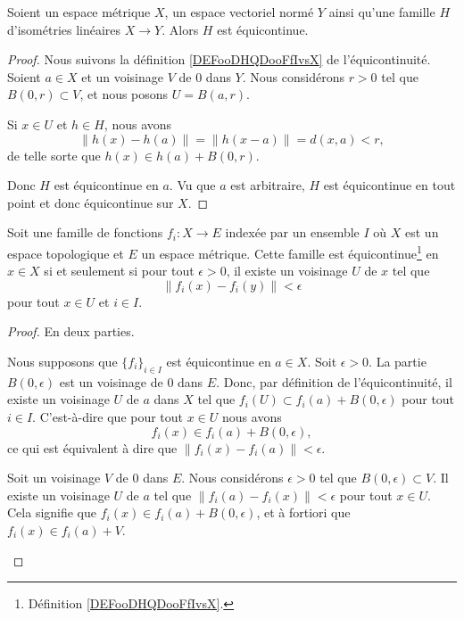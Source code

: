 \begin{lemma}        \label{LEMooMIHJooUhvPgM}
	Soient un espace métrique \( X\), un espace vectoriel normé \( Y\) ainsi qu'une famille \( H\) d'isométries linéaires \( X\to Y\). Alors \( H\) est équicontinue.
\end{lemma}

\begin{proof}
	Nous suivons la définition \ref{DEFooDHQDooFfIvsX} de l'équicontinuité. Soient \( a\in X\) et un voisinage \( V\) de \( 0\) dans \( Y\). Nous considérons \( r>0\) tel que \( B(0,r)\subset V\), et nous posons \( U=B(a,r)\).

	Si \( x\in U\) et \( h\in H\), nous avons
	\begin{equation}
		\| h(x)-h(a) \|=\| h(x-a) \|=d(x,a)<r,
	\end{equation}
	de telle sorte que \( h(x)\in h(a)+B(0,r)\).

	Donc \( H\) est équicontinue en \( a\). Vu que \( a\) est arbitraire, \( H\) est équicontinue en tout point et donc équicontinue sur \( X\).
\end{proof}

\begin{lemma}           \label{LEMooKEMRooYyqsBl}
	Soit une famille de fonctions \( f_i\colon X\to E\) indexée par un ensemble \( I\) où \( X\) est un espace topologique et \( E\) un espace métrique. Cette famille est équicontinue\footnote{Définition \ref{DEFooDHQDooFfIvsX}.} en \( x\in X\) si et seulement si pour tout \( \epsilon>0\), il existe un voisinage \( U\) de \( x\) tel que
	\begin{equation}
		\| f_i(x)-f_i(y) \|<\epsilon
	\end{equation}
	pour tout \( x\in U\) et \( i\in I\).
\end{lemma}

\begin{proof}
	En deux parties.
	\begin{subproof}
		\spitem[\( \Rightarrow\)]
		Nous supposons que \( \{ f_i \}_{i\in I}\) est équicontinue en \( a\in X\). Soit \( \epsilon>0\). La partie \( B(0,\epsilon)\) est un voisinage de \( 0\) dans \( E\). Donc, par définition de l'équicontinuité, il existe un voisinage \( U\) de \( a\) dans \( X\) tel que \( f_i(U)\subset f_i(a)+B(0,\epsilon)\) pour tout \( i\in I\). C'est-à-dire que pour tout \( x\in U\) nous avons
		\begin{equation}
			f_i(x)\in f_i(a)+B(0,\epsilon),
		\end{equation}
		ce qui est équivalent à dire que \( \| f_i(x)-f_i(a) \|<\epsilon\).

		\spitem[\( \Leftarrow\)]
		Soit un voisinage \( V\) de \( 0\) dans \( E\). Nous considérons \( \epsilon>0\) tel que \( B(0,\epsilon)\subset V\). Il existe un voisinage \( U\) de \( a\) tel que \( \| f_i(a)-f_i(x) \|<\epsilon\) pour tout \( x\in U\). Cela signifie que \( f_i(x)\in f_i(a)+B(0,\epsilon)\), et à fortiori que \( f_i(x)\in f_i(a)+V\).
	\end{subproof}
\end{proof}

